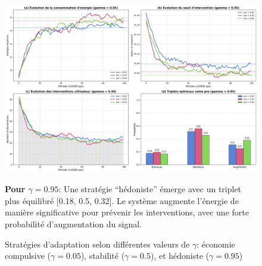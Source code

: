 \documentclass[a4paper,11pt]{article}
\begin{document}
\begin{figure}[!htbp]

    \begin{minipage}[c]{0.48\textwidth}
        \includegraphics[width=\textwidth]{figures/experience4_gamma_0.95.png}
    \end{minipage}
    \hfill
    \begin{minipage}[c]{0.48\textwidth}
        \textbf{Pour $\gamma=0.95$}: Une stratégie ``hédoniste'' émerge avec un triplet plus équilibré [0.18, 0.5, 0.32]. Le système augmente l'énergie de manière significative pour prévenir les interventions, avec une forte probabilité d'augmentation du signal.
    \end{minipage}
    \caption{Stratégies d'adaptation selon différentes valeurs de $\gamma$: économie compulsive ($\gamma=0.05$), stabilité ($\gamma=0.5$), et hédoniste ($\gamma=0.95$)}
    \label{fig:gamma_compare}
\end{figure}

    
    
\end{document}
